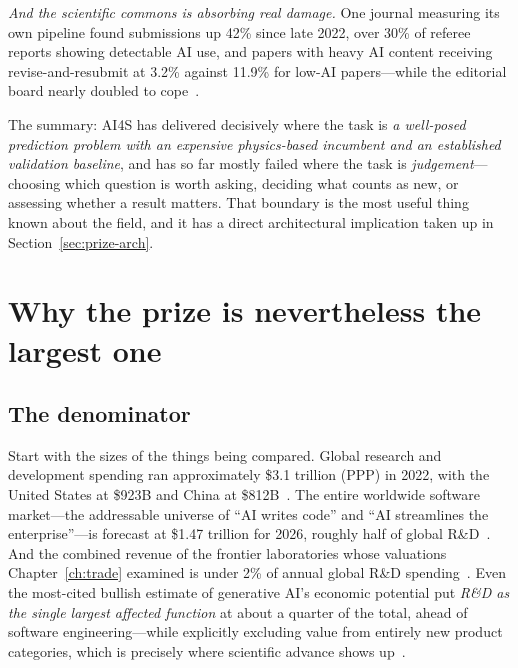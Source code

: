\emph{And the scientific commons is absorbing real damage.} One journal measuring its own pipeline found submissions up 42\% since late 2022, over 30\% of referee reports showing detectable AI use, and papers with heavy AI content receiving revise-and-resubmit at 3.2\% against 11.9\% for low-AI papers---while the editorial board nearly doubled to cope~\cite{ai-slop}.

The summary: AI4S has delivered decisively where the task is \emph{a well-posed prediction problem with an expensive physics-based incumbent and an established validation baseline}, and has so far mostly failed where the task is \emph{judgement}---choosing which question is worth asking, deciding what counts as new, or assessing whether a result matters. That boundary is the most useful thing known about the field, and it has a direct architectural implication taken up in Section~\ref{sec:prize-arch}.

\section{Why the prize is nevertheless the largest one}

\subsection{The denominator}
\label{sec:denominator}

Start with the sizes of the things being compared. Global research and development spending ran approximately \$3.1 trillion (PPP) in 2022, with the United States at \$923B and China at \$812B~\cite{nsf-indicators}. The entire worldwide software market---the addressable universe of ``AI writes code'' and ``AI streamlines the enterprise''---is forecast at \$1.47 trillion for 2026, roughly half of global R\&D~\cite{gartner}. And the combined revenue of the frontier laboratories whose valuations Chapter~\ref{ch:trade} examined is under 2\% of annual global R\&D spending~\cite{lab-revenue}. Even the most-cited bullish estimate of generative AI's economic potential put \emph{R\&D as the single largest affected function} at about a quarter of the total, ahead of software engineering---while explicitly excluding value from entirely new product categories, which is precisely where scientific advance shows up~\cite{mckinsey-genai}.

